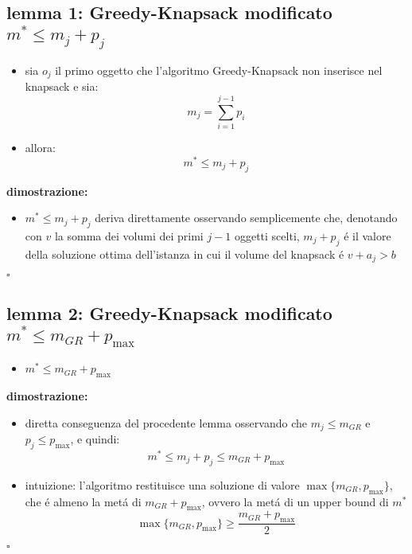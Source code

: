\subsection*{lemma 1: Greedy-Knapsack modificato $m^*\leq m_j+p_j$}
\begin{flushleft}
	\begin{itemize}
		\item sia $o_j$ il primo oggetto che l'algoritmo Greedy-Knapsack non inserisce nel knapsack e sia:
			$$m_j=\sum_{i=1}^{j-1}p_i$$
		\item allora:
			$$m^*\leq m_j+p_j$$
	\end{itemize}
	\vspace{0.5cm}
	\textbf{dimostrazione:}
	\begin{itemize}
		\item $m^*\leq m_j+p_j$ deriva direttamente osservando semplicemente che, denotando con $v$ la somma dei volumi dei primi $j-1$ oggetti scelti, $m_j+p_j$ \'e il valore della soluzione ottima dell'istanza in cui il volume del knapsack \'e $v+a_j>b$
	\end{itemize}
	\hfill$\square$
\end{flushleft}


\subsection*{lemma 2: Greedy-Knapsack modificato $m^*\leq m_{GR}+p_{\max}$}
\begin{flushleft}
	\begin{itemize}
		\item[] $m^*\leq m_{GR}+p_{\max}$
	\end{itemize}
	\vspace{0.5cm}
	\textbf{dimostrazione:}
	\begin{itemize}
		\item diretta conseguenza del procedente lemma osservando che $m_j\leq m_{GR}$ e $p_j\leq p_{\max}$, e quindi:
			$$m^*\leq m_j+p_j\leq m_{GR}+p_{\max}$$
		\item intuizione: l'algoritmo restituisce una soluzione di valore $\max\{m_{GR},p_{\max}\}$, che \'e almeno la met\'a di $m_{GR}+p_{\max}$, ovvero la met\'a di un upper bound di $m^*$
			$$\max\{m_{GR},p_{\max}\}\geq\frac{m_{GR}+p_{\max}}{2}$$
	\end{itemize}
	\hfill$\square$
\end{flushleft}


